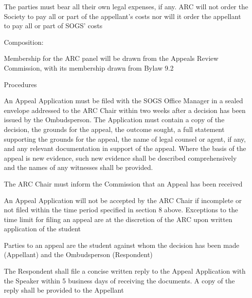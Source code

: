 \begin{longenum}[ label*=\arabic*., align=left]
\begin{longenum}[ label*=\arabic*., align=left]
\begin{longenum}[ label*=\arabic*., align=left]
      \end{longenum}
      \item The parties must bear all their own legal expenses, if any. ARC will not order the Society to pay all or part of the appellant's costs nor will it order the appellant to pay all or part of SOGS' costs
      \item Composition: 
                  
Membership  for  the  ARC  panel  will  be  drawn  from  the  Appeals  Review  Commission,  with  its membership drawn from Bylaw 9.2
      \item Procedures
      
An  Appeal Application  must  be  filed  with  the  SOGS  Office  Manager  in  a  sealed  envelope addressed  to  the  ARC  Chair  within  two  weeks  after  a  decision  has  been  issued  by  the Ombudsperson. The Application must contain a copy of the decision, the grounds for the appeal, the  outcome  sought,  a  full  statement  supporting  the  grounds  for  the  appeal,  the  name  of  legal counsel  or  agent,  if  any,  and  any  relevant  documentation  in  support  of  the  appeal.  Where  the basis of the appeal is new evidence, such new evidence shall be described comprehensively and the names of any witnesses shall be provided.
    \begin{longenum}[ label*=\arabic*., align=left]
			\item The ARC Chair must inform the Commission that an Appeal has been received
      \end{longenum}
\item An Appeal Application will not be accepted by the ARC Chair if incomplete or not filed within the time period specified in section 8 above. Exceptions to the time limit for filing an appeal are at the discretion of the ARC upon written application of the student
\item Parties  to  an  appeal  are  the  student  against  whom  the  decision  has  been  made  (Appellant) and the Ombudsperson (Respondent)   

\item The Respondent shall file a concise written reply to the Appeal Application with the Speaker within 5 business days of receiving the documents. A copy of the reply shall be provided to the Appellant


\end{longenum}
\end{longenum}
